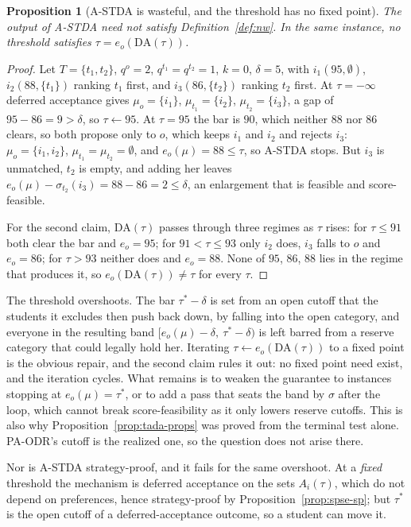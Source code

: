 \documentclass[a4paper,twoside]{article}
\newtheorem{proposition}{Proposition}
\theoremstyle{definition}
\begin{document}
\begin{proposition}[A-STDA is wasteful, and the threshold has no fixed point]
\label{prop:tada-nw}
The output of A-STDA need not satisfy Definition~\ref{def:nw}. In the same instance, no threshold satisfies $\tau=e_o(\mathrm{DA}(\tau))$.
\end{proposition}

\begin{proof}
Let $T=\{t_1,t_2\}$, $q^o=2$, $q^{t_1}=q^{t_2}=1$, $k=0$, $\delta=5$, with $i_1(95,\emptyset)$, $i_2(88,\{t_1\})$ ranking $t_1$ first, and $i_3(86,\{t_2\})$ ranking $t_2$ first. At $\tau=-\infty$ deferred acceptance gives $\mu_o=\{i_1\}$, $\mu_{t_1}=\{i_2\}$, $\mu_{t_2}=\{i_3\}$, a gap of $95-86=9>\delta$, so $\tau\gets95$. At $\tau=95$ the bar is $90$, which neither $88$ nor $86$ clears, so both propose only to $o$, which keeps $i_1$ and $i_2$ and rejects $i_3$: $\mu_o=\{i_1,i_2\}$, $\mu_{t_1}=\mu_{t_2}=\emptyset$, and $e_o(\mu)=88\le\tau$, so A-STDA stops. But $i_3$ is unmatched, $t_2$ is empty, and adding her leaves $e_o(\mu)-\sigma_{t_2}(i_3)=88-86=2\le\delta$, an enlargement that is feasible and score-feasible.

For the second claim, $\mathrm{DA}(\tau)$ passes through three regimes as $\tau$ rises: for $\tau\le91$ both clear the bar and $e_o=95$; for $91<\tau\le93$ only $i_2$ does, $i_3$ falls to $o$ and $e_o=86$; for $\tau>93$ neither does and $e_o=88$. None of $95$, $86$, $88$ lies in the regime that produces it, so $e_o(\mathrm{DA}(\tau))\neq\tau$ for every $\tau$.
\end{proof}

The threshold overshoots. The bar $\tau^\ast-\delta$ is set from an open cutoff that the students it excludes then push back down, by falling into the open category, and everyone in the resulting band $[e_o(\mu)-\delta,\ \tau^\ast-\delta)$ is left barred from a reserve category that could legally hold her. Iterating $\tau\gets e_o(\mathrm{DA}(\tau))$ to a fixed point is the obvious repair, and the second claim rules it out: no fixed point need exist, and the iteration cycles. What remains is to weaken the guarantee to instances stopping at $e_o(\mu)=\tau^\ast$, or to add a pass that seats the band by $\sigma$ after the loop, which cannot break score-feasibility as it only lowers reserve cutoffs. This is also why Proposition~\ref{prop:tada-props} was proved from the terminal test alone. PA-ODR's cutoff is the realized one, so the question does not arise there.

Nor is A-STDA strategy-proof, and it fails for the same overshoot. At a \emph{fixed} threshold the mechanism is deferred acceptance on the sets $A_i(\tau)$, which do not depend on preferences, hence strategy-proof by Proposition~\ref{prop:spse-sp}; but $\tau^\ast$ is the open cutoff of a deferred-acceptance outcome, so a student can move it.
\end{document}

